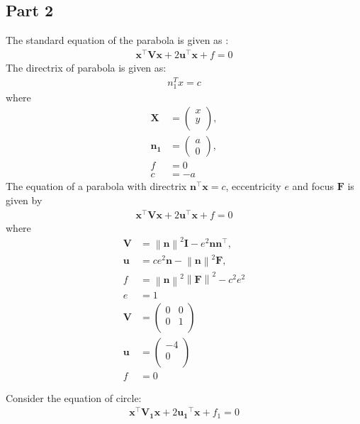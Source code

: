 \documentclass[journal,10pt,twocolumn]{article}
\providecommand{\norm}[1]{\left\lVert#1\right\rVert}
\let\vec\mathbf
\newcommand{\myvec}[1]{\ensuremath{\begin{pmatrix}#1\end{pmatrix}}}
\begin{document}
\subsection*{Part 2}
The standard equation of the parabola is given as :
\begin{align}
\vec{x}^{\top}\vec{V}\vec{x}+2\vec{u}^{\top}\vec{x}+f=0
\end{align}
The directrix of parabola is given as:
\begin{align}
		n_1^Tx=c	
\end{align}
where
\begin{align}
	\label{eq:V_matrix}
	\vec{X} &= \myvec{x \\
	                   y \\},
	\\
	\label{eq:u_vector}
	\vec{n_1} &= \myvec{a\\0},
	\\
	\label{eq:f_value}
	f &= 0
	\\
	c&=-a
\end{align}
The equation of  a parabola with directrix $\vec{n}^{\top}\vec{x} = c$, eccentricity $e$ and focus $\vec{F}$ is given by 
\begin{align}
    \label{eq:conic_quad_form}
    \vec{x}^{\top}\vec{V}\vec{x}+2\vec{u}^{\top}\vec{x}+f=0
    \end{align}
where     
\begin{align}
  \label{eq:conic_quad_form_v}
\vec{V} &=\norm{\vec{n}}^2\vec{I}-e^2\vec{n}\vec{n}^{\top}, 
\\
\label{eq:conic_quad_form_u}
\vec{u} &= ce^2\vec{n}-\norm{\vec{n}}^2\vec{F}, 
\\
\label{eq:conic_quad_form_f}
f &= \norm{\vec{n}}^2\norm{\vec{F}}^2-c^2e^2
\\
e&=1
\\
\vec{V}&=\begin{pmatrix}
	0 & 0\\
	0 & 1\\
	\end{pmatrix} \\
    \vec{u}&=\begin{pmatrix}
	-4\\
	0 \\
	\end{pmatrix} \\
	f&=0
    \end{align}

Consider the equation of circle:
\begin{align}
\vec{x}^{\top}\vec{V_1}\vec{x}+2\vec{u_1}^{\top}\vec{x}+f_1=0
\end{align}
  
\end{document}
